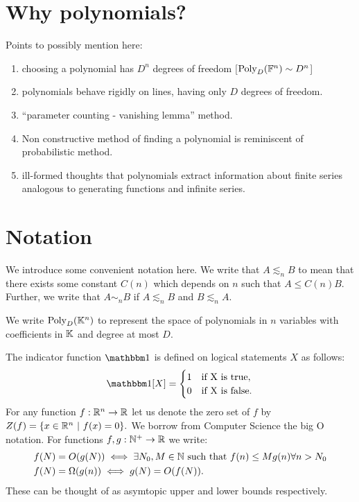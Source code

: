 \section{Why polynomials?}

Points to possibly mention here:
\begin{enumerate}
    \item choosing a polynomial has $D^n$ degrees of freedom [$\text{Poly}_D(\mathbb F^n) \sim D^n$]
    \item polynomials behave rigidly on lines, having only $D$ degrees of freedom.
    \item ``parameter counting - vanishing lemma'' method. 
    \item Non constructive method of finding a polynomial is reminiscent of probabilistic method.\cite{GOW2020} \cite{GUTH2016}
    \item ill-formed thoughts that polynomials extract information about finite series analogous to generating functions and infinite series. 
\end{enumerate}

\section*{Notation}
We introduce some convenient notation here. We write that $A \lesssim_n B$ to mean that there exists some constant
$C(n)$ which depends on $n$ such that $A \leq C(n) B$. Further, we write that $A \sim_n B$ if $A \lesssim_n B$ and $B \lesssim_n A$.

We write $\text{Poly}_D (\mathbb K^n)$ to represent the space of polynomials in $n$ variables with coefficients in $\mathbb K$ and degree at most $D$.

The indicator function $\OO$ is defined on logical statements $X$ as follows:
\[
    \OO[X] = 
  \begin{cases}
      1 & \text{if X is true}, \\
      0 & \text{if X is false}.
  \end{cases}  
\]
For any function $f : \mathbb R^n \to \mathbb R$ let us denote the zero set of $f$ by $Z(f) = \{x \in \mathbb R^n \ | \ f(x) = 0\}.$
We borrow from Computer Science the big O notation. For functions $f,g : \mathbb N^+ \to \mathbb R$ we write:
\begin{align*}
    f(N) &= O(g(N)) \iff \exists N_0, M \in \mathbb N \text{ such that } f(n) \leq Mg(n) \forall n > N_0 \\
    f(N) &= \Omega(g(n)) \iff g(N) = O(f(N)).
\end{align*}
These can be thought of as asymtopic upper and lower bounds respectively.